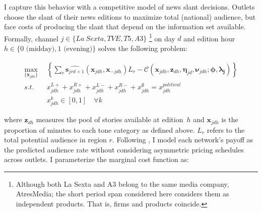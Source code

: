 \documentclass[12pt]{article}
\begin{document}
I capture this behavior with a competitive model of news slant decisions. Outlets choose the slant of their news editions to maximize total (national) audience, but face costs of producing the slant that depend on the information set available.  Formally, channel $j\in \{La \ Sexta, TVE, T5, A3\}$ \footnote{Although both La Sexta and A3 belong to the same media company, AtresMedia; the short period span considered here considers them as independent products. That is, firms and products coincide. } on day $d$ and edition hour $h\in\{0\text{ (midday)},1\text{ (evening)}\}$ solves the following problem:



\begin{equation}\label{eq:payoffs}
	\begin{aligned}
		\max_{\{\mathbf{x}_{jdh}\}}   & \left\{   \sum_{r}\widehat{\bm{s}_{jrd+1}}(\bm{x}_{jdh}, \bm{x}_{-jdh})L_r -  \mathcal{C}\left(  \bm{x}_{jdh},\bm{z}_{dh}, \bm{\eta}_{jd},\bm{\nu}_{jdh}; \bm{\phi},\bm{\lambda_j}   \right)    \right\}\\
		s.t.   \quad &   x_{jdh}^{L+} +x_{jdh}^{R+} + x_{jdh}^{L-} + x_{jdh}^{R-} + x_{jdh}^{\emptyset} = x_{jdh}^{political}\\
		& x_{jdh}^k \in [0,1] \quad \forall k
	\end{aligned}
\end{equation} 



where $\bm z_{dh}$ measures the pool of stories available at edition~$h$ and $\bm x_{jdh}$ is the proportion of minutes to each tone category as defined above. $L_r$  refers to the total potential audience in region $r$. Following \cite{Goettler2001SpatialCI}, I model each network's payoff as the predicted audience rate without considering asymmetric pricing schedules across outlets. I parameterize the marginal cost function as:

\end{document}

